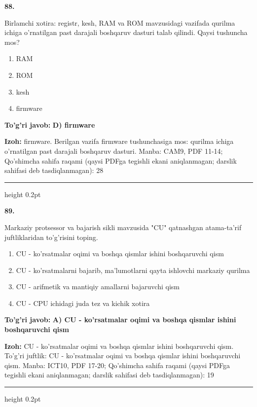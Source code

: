 \documentclass[10pt,a4paper]{article}
\begin{document}
{\bfseries\sffamily\color{ink} 88.}
\par
Birlamchi xotira: registr, kesh, RAM va ROM mavzusidagi vazifada qurilma ichiga o'rnatilgan past darajali boshqaruv dasturi talab qilindi. Qaysi tushuncha mos?
\begin{enumerate}[label=\Alph*),leftmargin=9mm]
\item RAM
\item ROM
\item kesh
\item firmware
\end{enumerate}
\begin{tcolorbox}[enhanced,breakable,colback=teal!4,colframe=teal!60!black,boxrule=0.45pt,arc=1.2mm,left=2.7mm,right=2.7mm,top=1.8mm,bottom=1.8mm,before skip=2mm,after skip=2mm]
{\bfseries\sffamily\color{teal}To'g'ri javob:} \textbf{D) firmware}
\par\smallskip
{\bfseries Izoh:} firmware. Berilgan vazifa firmware tushunchasiga mos: qurilma ichiga o'rnatilgan past darajali boshqaruv dasturi. Manba: CAM9, PDF 11-14; Qo'shimcha sahifa raqami (qaysi PDFga tegishli ekani aniqlanmagan; darslik sahifasi deb tasdiqlanmagan): 28
\end{tcolorbox}
\vspace{2mm}\hrule height 0.2pt\vspace{3mm}

{\bfseries\sffamily\color{ink} 89.}
\par
Markaziy protsessor va bajarish sikli mavzusida "CU" qatnashgan atama-ta'rif juftliklaridan to'g'risini toping.
\begin{enumerate}[label=\Alph*),leftmargin=9mm]
\item CU - ko'rsatmalar oqimi va boshqa qismlar ishini boshqaruvchi qism
\item CU - ko'rsatmalarni bajarib, ma'lumotlarni qayta ishlovchi markaziy qurilma
\item CU - arifmetik va mantiqiy amallarni bajaruvchi qism
\item CU - CPU ichidagi juda tez va kichik xotira
\end{enumerate}
\begin{tcolorbox}[enhanced,breakable,colback=teal!4,colframe=teal!60!black,boxrule=0.45pt,arc=1.2mm,left=2.7mm,right=2.7mm,top=1.8mm,bottom=1.8mm,before skip=2mm,after skip=2mm]
{\bfseries\sffamily\color{teal}To'g'ri javob:} \textbf{A) CU - ko'rsatmalar oqimi va boshqa qismlar ishini boshqaruvchi qism}
\par\smallskip
{\bfseries Izoh:} CU - ko'rsatmalar oqimi va boshqa qismlar ishini boshqaruvchi qism. To'g'ri juftlik: CU - ko'rsatmalar oqimi va boshqa qismlar ishini boshqaruvchi qism. Manba: ICT10, PDF 17-20; Qo'shimcha sahifa raqami (qaysi PDFga tegishli ekani aniqlanmagan; darslik sahifasi deb tasdiqlanmagan): 19
\end{tcolorbox}
\vspace{2mm}\hrule height 0.2pt\vspace{3mm}
\end{document}
